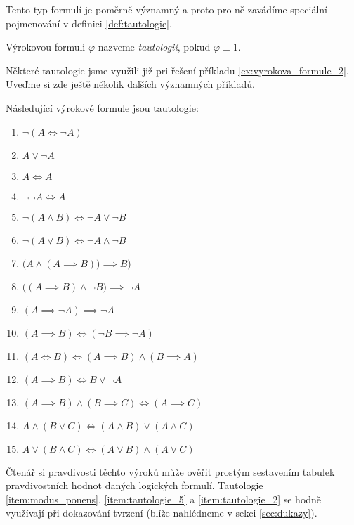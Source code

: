 Tento typ formulí je poměrně významný a proto pro ně zavádíme speciální pojmenování v definici \ref{def:tautologie}.
\begin{definition}[Tautologie]\label{def:tautologie}
    Výrokovou formuli $\varphi$ nazveme \emph{tautologií}, pokud $\varphi\equiv 1$.
\end{definition}

Některé tautologie jsme využili již pri řešení příkladu \ref{ex:vyrokova_formule_2}. Uveďme si zde ještě několik dalších významných příkladů.
\begin{theorem}\label{thm:vyznamne_tautologie}
    Následující výrokové formule jsou tautologie:
    \begin{enumerate}[label=(\roman*)]
        \item\label{item:tautologie_1} $\neg (A \iff \neg A)$
        \item\label{item:zakon_vylouceneho_tretiho} $A \lor \neg A$ 
        \item\label{item:zakon_identity} $A \iff A$ 
        \item\label{item:zakon_dvoji_negace} $\neg\neg A \iff A$ 
        \item\label{item:de_morgan_1} $\neg (A \land B) \iff \neg A \lor \neg B$ 
        \item\label{item:de_morgan_2} $\neg (A \lor B) \iff \neg A \land \neg B$ 
        \item\label{item:modus_ponens} $\big(A \land (A \implies B)\big) \implies B)$ 
        \item\label{item:modus_tollens_1} $\big((A \implies B) \land \neg B\big) \implies \neg A$ 
        \item\label{item:reductio_ad_absurdum} $(A \implies \neg A) \implies \neg A$
        \item\label{item:tautologie_5} $(A \implies B) \iff (\neg B \implies \neg A)$
        \item\label{item:tautologie_2} $(A \iff B) \iff (A \implies B) \land (B \implies A)$
        \item\label{item:tautologie_3} $(A \implies B) \iff B \lor \neg A$
        \item\label{item:tautologie_4} $(A \implies B) \land (B \implies C) \iff (A \implies C)$
        \item\label{item:tautologie_6} $A \land (B \lor C) \iff (A \land B) \lor (A \land C)$
        \item\label{item:tautologie_7} $A \lor (B \land C) \iff (A \lor B) \land (A \lor C)$
    \end{enumerate}
\end{theorem}

Čtenář si pravdivosti těchto výroků může ověřit prostým sestavením tabulek pravdivostních hodnot daných logických formulí. Tautologie \ref{item:modus_ponens}, \ref{item:tautologie_5} a \ref{item:tautologie_2} se hodně využívají při dokazování tvrzení (blíže nahlédneme v sekci \ref{sec:dukazy}).